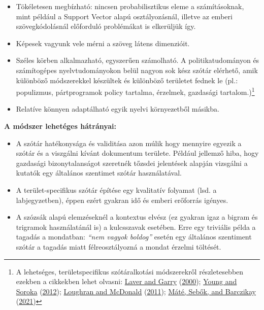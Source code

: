 \documentclass[
]{book}
\providecommand{\tightlist}{%
  \setlength{\itemsep}{0pt}\setlength{\parskip}{0pt}}
\begin{document}
\begin{itemize}
\tightlist
\item
  Tökéletesen megbízható: nincsen probabilisztikus eleme a
  számításoknak, mint például a Support Vector alapú osztályozásnál,
  illetve az emberi szövegkódolásnál előforduló problémákat is
  elkerüljük így.
\item
  Képesek vagyunk vele mérni a szöveg látens dimenzióit.
\item
  Széles körben alkalmazható, egyszerűen számolható. A
  politikatudományon és számítogépes nyelvtudományokon belül nagyon sok
  kész szótár elérhető, amik különböző módszerekkel készültek és
  különböző területet fednek le (pl.: populizmus, pártprogramok policy
  tartalma, érzelmek, gazdasági tartalom.)\footnote{A lehetséges,
    területspecifikus szótáralkotási módszerekről részletesebben ezekben
    a cikkekben lehet olvasni:
    \protect\hyperlink{ref-laver2000estimating}{Laver and Garry}
    (\protect\hyperlink{ref-laver2000estimating}{2000});
    \protect\hyperlink{ref-young2012affective}{Young and Soroka}
    (\protect\hyperlink{ref-young2012affective}{2012});
    \protect\hyperlink{ref-loughran2011}{Loughran and McDonald}
    (\protect\hyperlink{ref-loughran2011}{2011});
    \protect\hyperlink{ref-muxe1tuxe92021}{Máté, Sebők, and Barczikay}
    (\protect\hyperlink{ref-muxe1tuxe92021}{2021})}
\item
  Relatíve könnyen adaptálható egyik nyelvi környezetből másikba.
\end{itemize}

\textbf{A módszer lehetéges hátrányai:}

\begin{itemize}
\tightlist
\item
  A szótár hatékonysága és validitása azon múlik hogy mennyire egyezik a
  szótár és a viszgálni kívánt dokumentum területe. Például jellemző
  hiba, hogy gazdasági bizonytalanságot szeretnék tőzsdei jelentések
  alapján vizsgálni a kutatók egy általános szentimet szótár
  használatával.
\item
  A terület-specifikus szótár építése egy kvalitatív folyamat (lsd. a
  labjegyzetben), éppen ezért gyakran idő és emberi erőforrás igényes.
\item
  A szózsák alapú elemzéseknél a kontextus elvész (ez gyakran igaz a
  bigram és trigramok használatánál is) a kulcsszavak esetében. Erre egy
  triviális példa a tagadás a mondatban: \emph{``nem vagyok boldog''}
  esetén egy általános szentiment szótár a tagadás miatt
  félreosztályozná a mondat érzelmi töltését.
\end{itemize}
\end{document}

